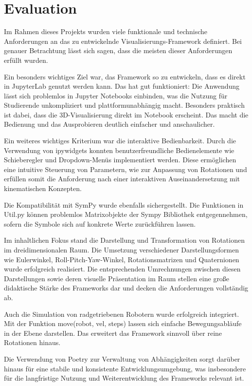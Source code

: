 \section{Evaluation}
Im Rahmen dieses Projekts wurden viele funktionale und technische Anforderungen an das zu entwickelnde Visualisierungs-Framework definiert.
Bei genauer Betrachtung lässt sich sagen, dass die meisten dieser Anforderungen erfüllt wurden.

Ein besonders wichtiges Ziel war, das Framework so zu entwickeln,
dass es direkt in JupyterLab genutzt werden kann. Das hat gut funktioniert:
Die Anwendung lässt sich problemlos in Jupyter Notebooks einbinden, was die Nutzung für Studierende unkompliziert und plattformunabhängig macht.
Besonders praktisch ist dabei, dass die 3D-Visualisierung direkt im Notebook erscheint. Das macht die Bedienung und das Ausprobieren deutlich einfacher und anschaulicher.

Ein weiteres wichtiges Kriterium war die interaktive Bedienbarkeit.
Durch die Verwendung von ipywidgets konnten benutzerfreundliche Bedienelemente wie Schieberegler und Dropdown-Menüs implementiert werden.
Diese ermöglichen eine intuitive Steuerung von Parametern, wie zur Anpassung von Rotationen und erfüllen somit die
Anforderung nach einer interaktiven Auseinandersetzung mit kinematischen Konzepten.

Die Kompatibilität mit SymPy wurde ebenfalls sichergestellt. Die Funktionen in Util.py können problemlos Matrixobjekte der Sympy Bibliothek entgegennehmen,
sofern die Symbole sich auf konkrete Werte zurückführen lassen.

Im inhaltlichen Fokus stand die Darstellung und Transformation von Rotationen im dreidimensionalen Raum.
Die Umsetzung verschiedener Darstellungsformen wie Eulerwinkel, Roll-Pitch-Yaw-Winkel, Rotationsmatrizen und Quaternionen wurde erfolgreich realisiert.
Die entsprechenden Umrechnungen zwischen diesen Darstellungen sowie deren visuelle Präsentation im Raum stellen eine große didaktische Stärke des Frameworks dar und decken die Anforderungen vollständig ab.

Auch die Simulation von radgetriebenen Robotern wurde erfolgreich integriert. Mit der Funktion move(robot, vel, steps)
lassen sich einfache Bewegungsabläufe in der Ebene darstellen. Das erweitert das Framework sinnvoll über reine Rotationen hinaus.

Die Verwendung von Poetry zur Verwaltung von Abhängigkeiten sorgt darüber hinaus für eine stabile und konsistente Entwicklungsumgebung,
was insbesondere für die langfristige Nutzung und Weiterentwicklung des Frameworks relevant ist.

